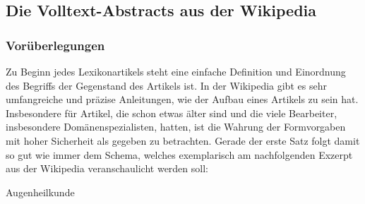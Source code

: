 \documentclass[pagesize,DIV=calc,12pt,draft]{scrreprt}
\begin{document}
\subsection{Die Volltext-Abstracts aus der Wikipedia}

\subsubsection{Vorüberlegungen}

Zu Beginn jedes Lexikonartikels steht eine einfache Definition und Einordnung des Begriffs der Gegenstand des Artikels ist. 
In der Wikipedia gibt es sehr umfangreiche und präzise Anleitungen, wie der Aufbau eines Artikels zu sein hat. 
Insbesondere für Artikel, die schon etwas älter sind und die viele Bearbeiter, insbesondere Domänenspezialisten, hatten, ist die Wahrung der Formvorgaben mit hoher Sicherheit als gegeben zu betrachten. 
Gerade der erste Satz folgt damit so gut wie immer dem Schema, welches exemplarisch am nachfolgenden Exzerpt aus der Wikipedia veranschaulicht werden soll: 

\begin{description}
\item[Augenheilkunde]
\end{description}
\end{document}
